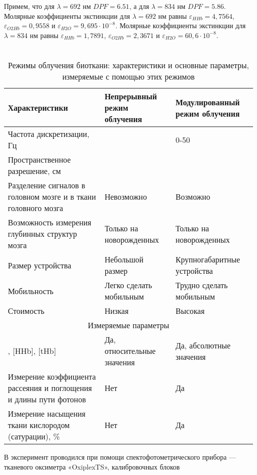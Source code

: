 Примем, что для $\lambda= 692$ нм $DPF = 6.51$, а для $\lambda= 834$ нм $DPF = 5.86$.
Молярные коэффициенты экстинкции для $\lambda= 692$ нм равны $\varepsilon_{HHb}=4,7564$, $\varepsilon_{O2Hb}=0,9558$ и $\varepsilon_{H2O}=9,695 \cdot 10^{-8}$.
Молярные коэффициенты экстинкции для $\lambda= 834$ нм равны $\varepsilon_{HHb}=1,7891$, $\varepsilon_{O2Hb}=2,3671$ и $\varepsilon_{H2O}=60,6 \cdot 10^{-8}$.


\begin{table}[!h]
\caption{\label{tab:2}\\Режимы облучения биоткани: характеристики и основные параметры, измеряемые с помощью этих режимов}
\begin{tabular}{|p{7.5cm}|p{4cm}|p{4cm}|}
\hline
Характеристики & Непрерывный режим облучения & Модулированный режим облучения \\
\hline
Частота дискретизации, Гц & \leq 50 & 0-50 \\
\hline
Пространственное разрешение, см &\leq 1 & \leq 1\\
\hline
Разделение сигналов в головном мозге и в ткани головного мозга & Невозможно & Возможно\\
\hline
Возможность измерения глубинных структур мозга & Только на новорожденных & Только на новорожденных\\
\hline
Размер устройства & Небольшой размер & Крупногабаритные устройства\\
\hline
Мобильность & Легко сделать мобильным & Трудно сделать мобильным\\
\hline
Стоимость & Низкая & Высокая \\
\hline
\multicolumn{3}{|c|}{Измеряемые параметры} \\
\hline
[O_2Hb], [HHb], [tHb] & Да, относительные значения & Да, абсолютные значения \\
\hline
Измерение коэффициента рассеяния и поглощения и длины пути фотонов & Нет & Да \\
\hline
Измерение насыщения ткани кислородом (сатурации), \% & Нет & Да \\
\hline
\end{tabular}
\end{table}
В эксперимент проводился при помощи спектофотометрического прибора — тканевого оксиметра «OxiplexTS», калибровочных блоков